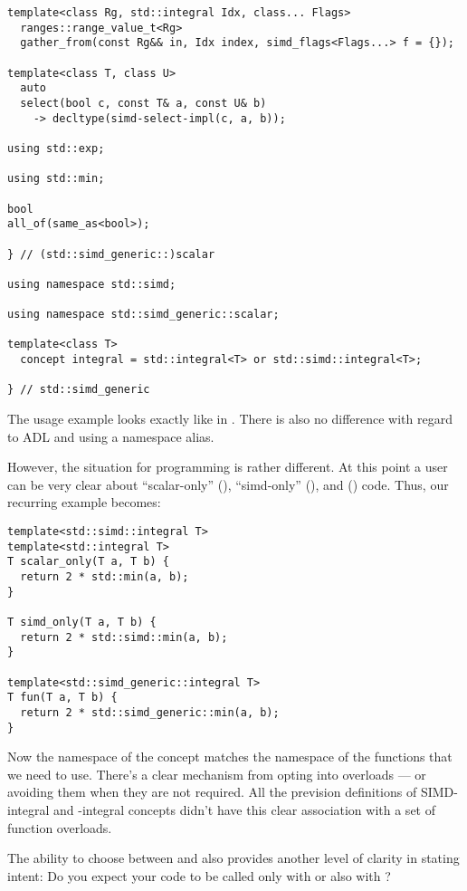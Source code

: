 \begin{lstlisting}[style=Vc]
template<class Rg, std::integral Idx, class... Flags>
  ranges::range_value_t<Rg>
  gather_from(const Rg&& in, Idx index, simd_flags<Flags...> f = {});

template<class T, class U>
  auto
  select(bool c, const T& a, const U& b)
    -> decltype(simd-select-impl(c, a, b));

using std::exp;

using std::min;

bool
all_of(same_as<bool>);

} // (std::simd_generic::)scalar

using namespace std::simd;

using namespace std::simd_generic::scalar;

template<class T>
  concept integral = std::integral<T> or std::simd::integral<T>;

} // std::simd_generic
\end{lstlisting}

The usage example looks exactly like in .
There is also no difference with regard to ADL and using a namespace alias.

However, the situation for \simdgeneric programming is rather different.
At this point a user can be very clear about “scalar-only” (),
“simd-only” (\std{}), and \simdgeneric (\std{})
code.
Thus, our recurring example becomes:
\medskip\begin{lstlisting}[style=Vc]
template<std::simd::integral T>
template<std::integral T>
T scalar_only(T a, T b) {
  return 2 * std::min(a, b);
}

T simd_only(T a, T b) {
  return 2 * std::simd::min(a, b);
}

template<std::simd_generic::integral T>
T fun(T a, T b) {
  return 2 * std::simd_generic::min(a, b);
}
\end{lstlisting}

Now the namespace of the  concept matches the namespace of the
functions that we need to use.
There's a clear mechanism from opting into \simdgeneric overloads --- or avoiding them when they are not required.
All the prevision definitions of SIMD-integral and \simdgeneric-integral
concepts didn't have this clear association with a set of function overloads.

The ability to choose between  and 
also provides another level of clarity in stating intent: Do you expect your
code to be called only with \simdT or also with ?

